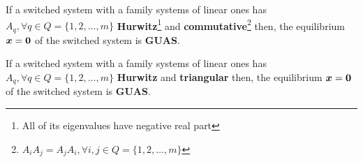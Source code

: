 \begin{theorem}
	If a switched system with a family systems of linear ones has $A_q, \forall q \in Q = \{1,2,\dots,m\}$ \textbf{Hurwitz}\footnote{All of its eigenvalues have negative real part} and \textbf{commutative}\footnote{$A_i A_j = A_j A_i, \forall i,j \in Q = \{1,2,\dots,m\}$} then, the equilibrium $\boldsymbol{x}=\boldsymbol{0}$ of the switched system is \textbf{GUAS}.
\end{theorem}

\begin{theorem}
	If a switched system with a family systems of linear ones has $A_q, \forall q \in Q = \{1,2,\dots,m\}$ \textbf{Hurwitz} and \textbf{triangular} then, the equilibrium $\boldsymbol{x}=\boldsymbol{0}$ of the switched system is \textbf{GUAS}.
\end{theorem}

